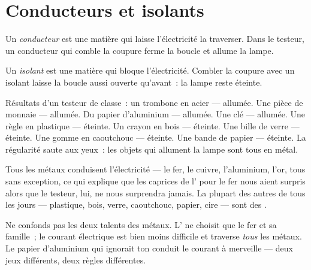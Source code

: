 \section{Conducteurs et isolants}

\begin{definition}[Conducteur]\label{def:g4:conductors-insulators:conductor}
Un \emph{conducteur} est une matière qui laisse
l'électricité la traverser. Dans le testeur, un conducteur qui comble
la coupure ferme la boucle et allume la lampe.
\end{definition}

\begin{definition}[Isolant]\label{def:g4:conductors-insulators:insulator}
Un \emph{isolant} est une matière qui bloque
l'électricité. Combler la coupure avec un isolant laisse la boucle
aussi ouverte qu'avant~: la lampe reste éteinte.
\end{definition}

\begin{example}\label{ex:g4:conductors-insulators:trials}
Résultats d'un testeur de classe~: un trombone en acier ---
allumée. Une pièce de monnaie --- allumée. Du papier d'aluminium ---
allumée. Une clé --- allumée. Une règle en plastique --- éteinte. Un
crayon en bois --- éteinte. Une bille de verre --- éteinte. Une gomme
en caoutchouc --- éteinte. Une bande de papier --- éteinte. La
régularité saute aux yeux~: les objets qui allument la lampe sont
tous en métal.
\end{example}

\begin{proposition}\label{prop:g4:conductors-insulators:metals}
Tous les métaux conduisent l'électricité --- le fer, le cuivre,
l'aluminium, l'or, tous sans exception, ce qui explique que les
caprices de l' pour le fer nous aient surpris alors que le
testeur, lui, ne nous surprendra jamais. La plupart des autres
 de tous les jours --- plastique, bois, verre, caoutchouc,
papier, cire --- sont des .
\end{proposition}

\begin{remark}\label{rem:g4:conductors-insulators:notmagnet}
Ne confonds pas les deux talents des métaux. L' ne choisit que
le fer et sa famille~; le courant électrique est bien moins
difficile et traverse \emph{tous} les métaux. Le papier d'aluminium
qui ignorait ton  conduit le courant à merveille --- deux jeux
différents, deux règles différentes.
\end{remark}

